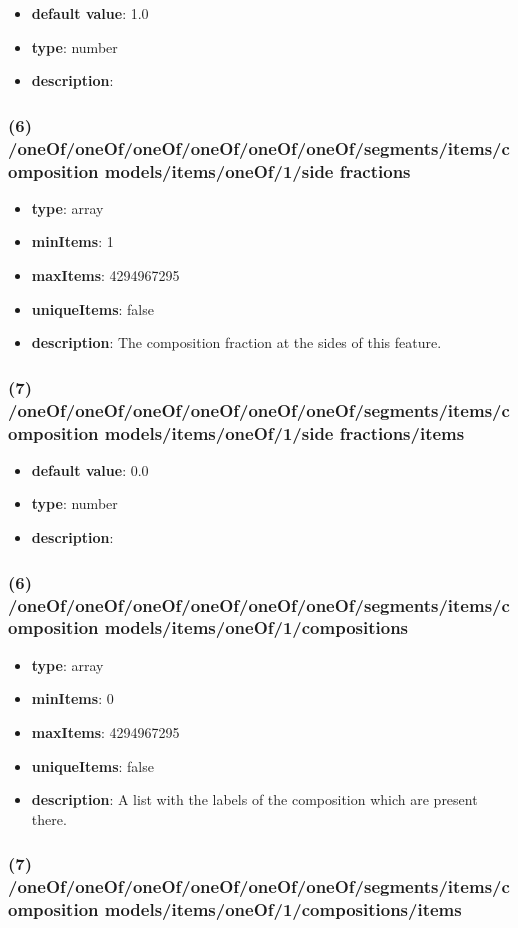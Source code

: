 \begin{itemize}[leftmargin=7em]\item {\bf default value}: 1.0
\item {\bf type}: number
\item {\bf description}: 
\end{itemize}\subsubsection{(6) /oneOf/oneOf/oneOf/oneOf/oneOf/oneOf/segments/items/composition models/items/oneOf/1/side fractions}
\begin{itemize}[leftmargin=6em]\item {\bf type}: array
\item {\bf minItems}: 1
\item {\bf maxItems}: 4294967295
\item {\bf uniqueItems}: false
\item {\bf description}: The composition fraction at the sides of this feature.
\end{itemize}\subsubsection{(7) /oneOf/oneOf/oneOf/oneOf/oneOf/oneOf/segments/items/composition models/items/oneOf/1/side fractions/items}
\begin{itemize}[leftmargin=7em]\item {\bf default value}: 0.0
\item {\bf type}: number
\item {\bf description}: 
\end{itemize}\subsubsection{(6) /oneOf/oneOf/oneOf/oneOf/oneOf/oneOf/segments/items/composition models/items/oneOf/1/compositions}
\begin{itemize}[leftmargin=6em]\item {\bf type}: array
\item {\bf minItems}: 0
\item {\bf maxItems}: 4294967295
\item {\bf uniqueItems}: false
\item {\bf description}: A list with the labels of the composition which are present there.
\end{itemize}\subsubsection{(7) /oneOf/oneOf/oneOf/oneOf/oneOf/oneOf/segments/items/composition models/items/oneOf/1/compositions/items}
